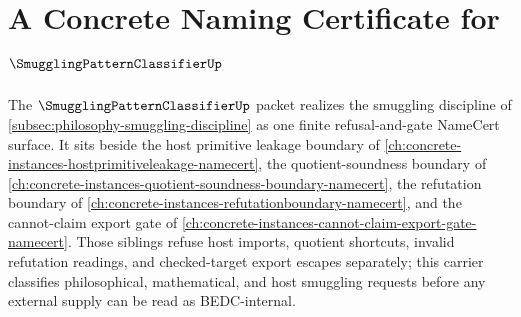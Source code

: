 \chapter{A Concrete Naming Certificate for $\SmugglingPatternClassifierUp$}
\label{ch:concrete-instances-smugglingpatternclassifier-namecert}

The $\SmugglingPatternClassifierUp$ packet realizes the smuggling discipline of \autoref{subsec:philosophy-smuggling-discipline} as one finite refusal-and-gate NameCert surface. It sits beside the host primitive leakage boundary of \autoref{ch:concrete-instances-hostprimitiveleakage-namecert}, the quotient-soundness boundary of \autoref{ch:concrete-instances-quotient-soundness-boundary-namecert}, the refutation boundary of \autoref{ch:concrete-instances-refutationboundary-namecert}, and the cannot-claim export gate of \autoref{ch:concrete-instances-cannot-claim-export-gate-namecert}. Those siblings refuse host imports, quotient shortcuts, invalid refutation readings, and checked-target export escapes separately; this carrier classifies philosophical, mathematical, and host smuggling requests before any external supply can be read as BEDC-internal.

